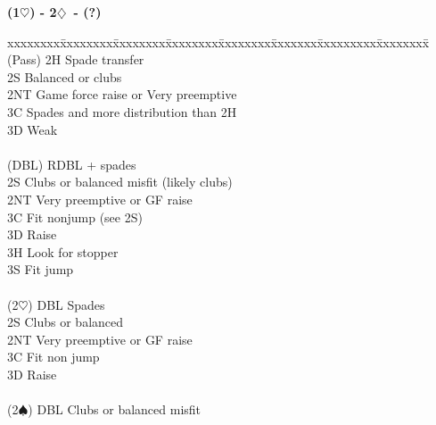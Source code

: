 \documentclass[10pt]{article}
\renewcommand{\d}{$\diamondsuit$}
\newcommand{\h}{$\heartsuit$}
\newcommand{\s}{$\spadesuit$}
\newcommand{\x}{DBL}
\newenvironment{bidtable}[1][]
{\textbf{#1}
  \begin{adjustwidth}{1em}{}
    \addvspace{2pt}
    \begin{tabbing}
      xxxxxxxx\=xxxxxxxx\=xxxxxxxx\=xxxxxxxx\=xxxxxxxx\=xxxxxxx\=xxxxxxxxx\=xxxxxxxx\=\kill}
{\end{tabbing}\end{adjustwidth}\bigskip}%
\begin{document}
\begin{bidtable}[(1\h) - 2\d\ - (?)]
(Pass) \> 2H   \> Spade transfer                                              \\
       \> 2S   \> Balanced or clubs                                           \\
       \> 2NT  \> Game force raise or Very preemptive                         \\
       \> 3C   \> Spades and more distribution than 2H                        \\
       \> 3D   \> Weak                                                        \\
                                                                              \\
(\x)   \> RDBL + spades                                                   \\
       \> 2S   \> Clubs or balanced misfit (likely clubs)                     \\
       \> 2NT  \> Very preemptive or GF raise                                 \\
       \> 3C   \> Fit nonjump  (see 2S)                                       \\
       \> 3D   \> Raise                                                       \\
       \> 3H   \> Look for stopper                                            \\
       \> 3S   \> Fit jump                                                    \\
                                                                              \\
(2\h)  \> DBL  \> Spades                                                      \\
       \> 2S   \> Clubs or balanced                                           \\
       \> 2NT  \> Very preemptive or GF raise                                 \\
       \> 3C   \> Fit non jump                                                \\
       \> 3D   \> Raise                                                       \\
                                                                              \\
(2\s)  \> DBL  \> Clubs or balanced misfit                                    \\

\end{bidtable}
\end{document}

